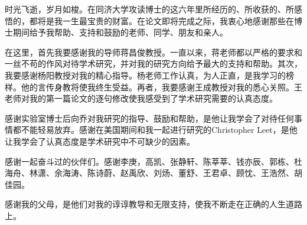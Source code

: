 时光飞逝，岁月如梭。在同济大学攻读博士的这六年里所经历的、所收获的、所感悟的，都将是我一生最宝贵的财富。在论文即将完成之际，我衷心地感谢那些在博士期间给予我帮助、支持和鼓励的老师、同学、朋友和亲人。

在这里，首先我要感谢我的导师蒋昌俊教授。一直以来，蒋老师都以严格的要求和一丝不苟的作风对待学术研究，并对我的研究方向给予最大的支持和帮助。其次，我要感谢杨阳教授对我的精心指导。杨老师工作认真，为人正直，是我学习的榜样。他的言传身教将使我终生受益。再者，我要感谢王成教授对我的悉心关照。王老师对我的第一篇论文的逐句修改使我感受到了学术研究需要的认真态度。

感谢实验室博士后向乔对我研究的指导、鼓励和帮助，是他让我学会了对待任何事情都不能轻易放弃。感谢在美国期间和我一起进行研究的Christopher Leet，是他让我学会了认真态度是学术研究中不可缺少的因素。

感谢一起奋斗过的伙伴们。感谢李庚，高凯、张静轩、陈莘莘、钱亦辰、郭栋、杜海舟、林潇、余海涛、陈诗蔚、赵禹欣、刘炀、董舒、王君卓、顾忱、王浩然、胡佳园。

感谢我的父母，是他们对我的谆谆教导和无限支持，使我不断走在正确的人生道路上。
